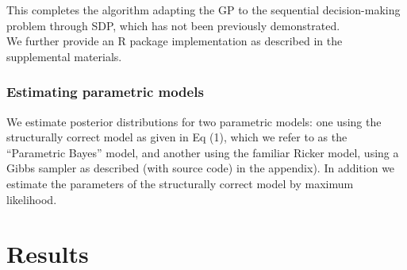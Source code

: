\documentclass[author-year, review]{elsarticle} %
\begin{document}
This completes the algorithm adapting the GP to the sequential
decision-making problem through SDP, which has not been previously
demonstrated.\\We further provide an R package implementation as
described in the supplemental materials.

\subsubsection{Estimating parametric models}

We estimate posterior distributions for two parametric models: one using
the structurally correct model as given in Eq (1), which we refer to as
the ``Parametric Bayes'' model, and another using the familiar Ricker
model, using a Gibbs sampler as described (with source code) in the
appendix). In addition we estimate the parameters of the structurally
correct model by maximum likelihood.

\section{Results}
\end{document}

